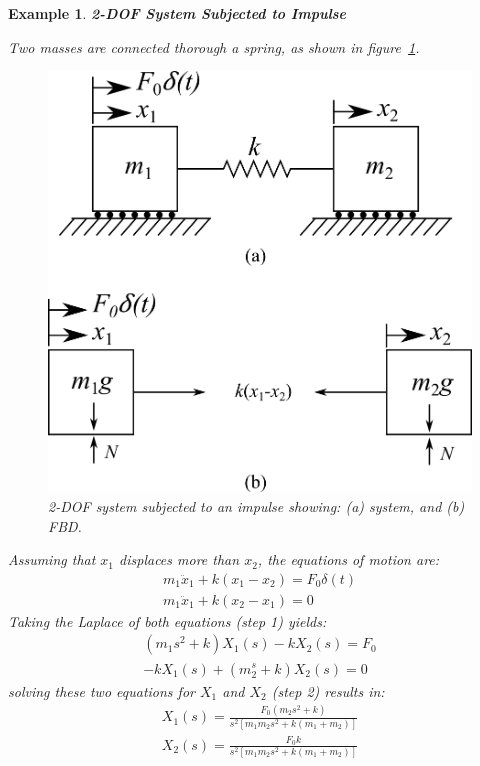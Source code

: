 \documentclass[12pt,letter]{article}
\newtheorem{ex}{Example}
\numberwithin{ex}{section} %
\newenvironment{example}{\begin{mdframed}[middlelinewidth=0.5mm]\begin{ex}\normalfont}{\end{ex}\end{mdframed}}
\numberwithin{re}{section} %
\begin{document}
\begin{example}
\textbf{2-DOF System Subjected to Impulse}

Two masses are connected thorough a spring, as shown in figure~\ref{fig:2-DOF-spring_mass_free}. 
\begin{figure}[H]
	\centering
	\includegraphics[]{../Figures/2-DOF-spring_mass_free.png}
	\caption{2-DOF system subjected to an impulse showing: (a) system, and (b) FBD.}
	\label{fig:2-DOF-spring_mass_free}
\end{figure}
Assuming that $x_1$ displaces more than $x_2$, the equations of motion are:
\begin{eqnarray}
m_1\ddot{x}_1 + k(x_1-x_2)  = F_0 \delta (t) \\
m_1\ddot{x}_1 + k(x_2-x_1)  = 0  \nonumber
\end{eqnarray}
Taking the Laplace of both equations (step 1) yields:
\begin{eqnarray}
(m_1 s^2 +k)X_1(s) - k X_2(s) = F_0 \\
-k X_1(s) + (m_2^s + k) X_2(s) = 0  \nonumber
\end{eqnarray}
solving these two equations for $X_1$ and $X_2$ (step 2) results in:
\begin{eqnarray}
X_1(s) = \frac{F_0(m_2 s^2 +k)}{s^2 [m_1 m_2 s^2 + k (m_1 + m_2)]} \\
X_2(s) = \frac{F_0 k}{s^2 [m_1 m_2 s^2 + k (m_1 + m_2)]} \nonumber

\end{eqnarray}
\end{example}
\end{document}
